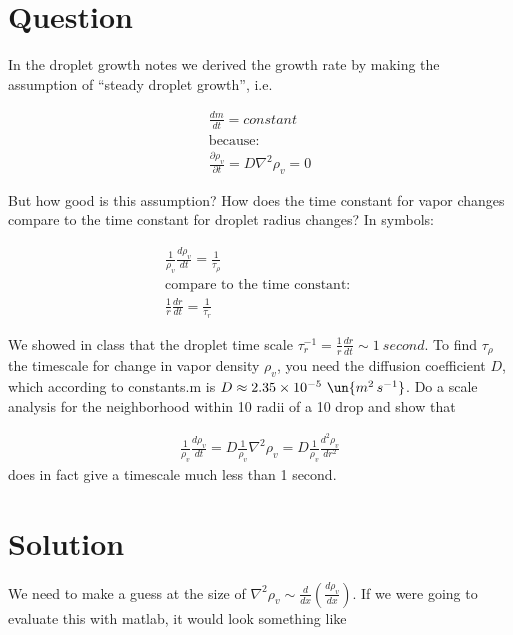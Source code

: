 \documentclass[12pt]{article}
\begin{document}
\newcommand{\vect}[1]{\boldsymbol{\vec{#1}}}
\pagestyle{first}


\section{Question}
\label{sec:question}



In the droplet growth notes we derived the growth rate
by making the assumption of
``steady droplet growth'', i.e.~

\begin{gather}
  \frac{ dm}{dt} = constant \\
\text{because: }\nonumber \\
\frac{ \partial \rho_v}{\partial t} = D \nabla^2 \rho_v = 0
\label{eq:steady}
\end{gather}

But how good is this assumption?  How does the time constant for
vapor changes compare to the time constant for droplet radius
changes? In symbols:

\begin{gather}
  \frac{1 }{\rho_v} \frac{ d \rho_v}{dt} = \frac{ 1}{\tau_\rho} \\
\text{compare to the time constant: }\nonumber \\
\frac{1}{r} \frac{ dr}{dt} = \frac{ 1}{\tau_r} 
\end{gather}


We showed in class that the droplet time scale $\tau^{-1}_r = \frac{ 1}{r}\frac{ dr}{dt}   \sim 1\ second$.  
To find $\tau_\rho$ the timescale for change in  vapor density $\rho_v$, you need
the diffusion coefficient $D$, which according to constants.m is $D \approx 2.35 \times 10^{-5}
\ \un{m^2\,s^{-1}}$.  Do a scale analysis for the neighborhood within  10 radii of  a 10 \mum drop and
show that 


\begin{gather}
  \frac{1 }{\rho_v} \frac{ d \rho_v}{dt} =  D \frac{1 }{\rho_v} \nabla^2 \rho_v = D  \frac{1 }{\rho_v} \frac{ d^2 \rho_v}{dr^2} 
\end{gather}
does in fact give a timescale much less than 1 second.

\section{Solution}
\label{sec:solution}


We need to make a guess at the size of $\nabla^2 \rho_v \sim \frac{ d}{dx} \left ( \frac{ d \rho_v}{dx} \right )$.  If we were
going to evaluate this with matlab, it would look something like
\end{document}
